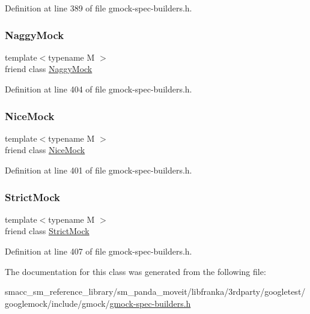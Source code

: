 Definition at line 389 of file gmock-\/spec-\/builders.\+h.

\mbox{\label{classtesting_1_1Mock_aee2e427ecb34e6662477add3bb5f8819}} 
\subsubsection{\texorpdfstring{Naggy\+Mock}{NaggyMock}}
{\footnotesize\ttfamily template$<$typename M $>$ \\
friend class \hyperlink{classtesting_1_1NaggyMock}{Naggy\+Mock}\hspace{0.3cm}{\ttfamily [friend]}}



Definition at line 404 of file gmock-\/spec-\/builders.\+h.

\mbox{\label{classtesting_1_1Mock_a9e796f79d4c876398f83aa7678dddc46}} 
\subsubsection{\texorpdfstring{Nice\+Mock}{NiceMock}}
{\footnotesize\ttfamily template$<$typename M $>$ \\
friend class \hyperlink{classtesting_1_1NiceMock}{Nice\+Mock}\hspace{0.3cm}{\ttfamily [friend]}}



Definition at line 401 of file gmock-\/spec-\/builders.\+h.

\mbox{\label{classtesting_1_1Mock_a88b3d71476c27b82c88bd49e8297e20e}} 
\subsubsection{\texorpdfstring{Strict\+Mock}{StrictMock}}
{\footnotesize\ttfamily template$<$typename M $>$ \\
friend class \hyperlink{classtesting_1_1StrictMock}{Strict\+Mock}\hspace{0.3cm}{\ttfamily [friend]}}



Definition at line 407 of file gmock-\/spec-\/builders.\+h.



The documentation for this class was generated from the following file\+:\begin{DoxyCompactItemize}
\item 
smacc\+\_\+sm\+\_\+reference\+\_\+library/sm\+\_\+panda\+\_\+moveit/libfranka/3rdparty/googletest/googlemock/include/gmock/\hyperlink{gmock-spec-builders_8h}{gmock-\/spec-\/builders.\+h}\end{DoxyCompactItemize}
